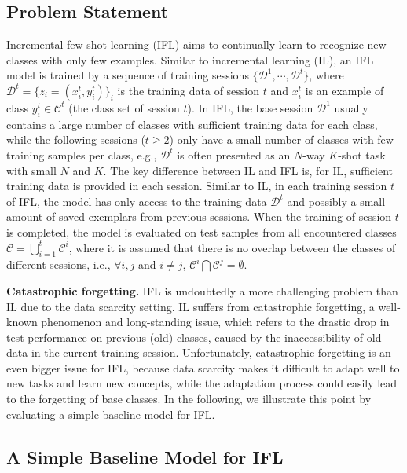 \documentclass{article}
\begin{document}
\subsection{Problem Statement}
Incremental few-shot learning (IFL) aims to continually learn to recognize new classes with only few examples. Similar to incremental learning (IL), an IFL model is trained by a sequence of training sessions $\{\mathcal{D}^1, \cdots, \mathcal{D}^t\}$, where  $\mathcal{D}^t=\{z_i=(x_i^t, y_i^t)\}_i$ is the training data of session $t$ and  $x_i^t$ is an example of class $y_i^t\in\mathcal{C}^{t}$ (the class set of session $t$). In IFL, the base session $\mathcal{D}^1$ usually contains a large number of classes with sufficient training data for each class, while the following sessions ($t\geq 2$) only have a small number of classes with few training samples per class, e.g., $\mathcal{D}^t$ is often presented as an $N$-way $K$-shot task with small $N$ and $K$. The key difference between IL and IFL is, for IL, sufficient training data is provided in each session. Similar to IL, in each training session $t$ of IFL, the model has only access to the training data $\mathcal{D}^t$ and possibly a small amount of saved exemplars from previous sessions. When the training of session $t$ is completed, the model is evaluated on test samples from all encountered classes $\mathcal{C}=\bigcup_{i=1}^t \mathcal{C}^{i}$, where it is assumed that there is no overlap between the classes of different sessions, i.e., $\forall i,j$ and $i\neq j$, $\mathcal{C}^i \bigcap \mathcal{C}^j = \emptyset$. 

\textbf{Catastrophic forgetting.} IFL is undoubtedly a more challenging problem than IL due to the data scarcity setting. IL suffers from catastrophic forgetting, a well-known phenomenon and long-standing issue, which refers to the drastic drop in test performance on previous (old) classes, caused by the inaccessibility of old data in the current training session. Unfortunately, catastrophic forgetting is an even bigger issue for IFL, because data scarcity makes it difficult to adapt well to new tasks and learn new concepts, while the adaptation process could easily lead to the forgetting of base classes. In the following, we illustrate this point by evaluating a simple baseline model for IFL.

\subsection{A Simple Baseline Model for IFL}
\end{document}
